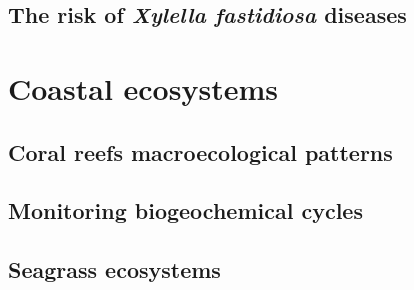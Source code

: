 


\subsection{\label{sec:The risk of Xylella fastidiosa diseases} The risk of
  \textit{Xylella fastidiosa} diseases}

\section{\label{sec:Data-driven modelling for coastal ecosystems} Coastal
  ecosystems}

\subsection{\label{sec:Coral reefs macroecological patterns} Coral reefs
  macroecological patterns}

\subsection{\label{sec:Monitoring biogeochemical cycles} Monitoring
  biogeochemical cycles}

\subsection{\label{sec:Seagrass ecosystems} Seagrass ecosystems}